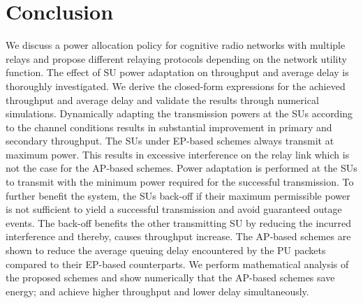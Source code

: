 \documentclass[journal,twocolumn]{IEEEtran}
\begin{document}
\section{Conclusion} \label{sect:conclusion}
We discuss a power allocation policy for cognitive radio networks with multiple relays and propose different relaying protocols depending on the network utility function. The effect of SU power adaptation on
throughput and average delay is thoroughly investigated. We derive the closed-form expressions for the achieved throughput and average delay and validate the results through numerical simulations. Dynamically adapting the transmission powers at the SUs according to the channel conditions results in substantial improvement in primary and secondary throughput. The SUs under EP-based schemes always transmit at maximum power. This results in excessive interference on the relay link which is not the case for the AP-based schemes. Power adaptation is performed at the SUs to transmit with the minimum power required for the successful
transmission. To further benefit the system, the SUs back-off if their maximum permissible power is not sufficient to yield a successful transmission and avoid guaranteed outage events. The back-off benefits the other transmitting SU by reducing the incurred interference and thereby, causes throughput increase.
The AP-based schemes are shown to reduce the average queuing delay encountered by the PU packets compared to their EP-based counterparts.
We perform mathematical analysis of the proposed schemes and show numerically that the AP-based schemes save energy; and achieve higher throughput and lower delay simultaneously.

\appendices
\end{document}
